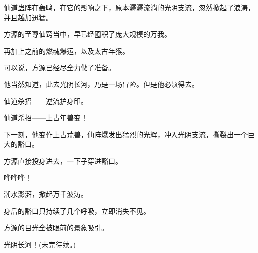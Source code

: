 \begin{this_body}
仙道蛊阵在轰鸣，在它的影响之下，原本潺潺流淌的光阴支流，忽然掀起了浪涛，并且越加迅猛。

方源的至尊仙窍当中，早已经囤积了庞大规模的万我。

再加上之前的燃魂爆运，以及太古年猴。

可以说，方源已经尽全力做了准备。

他当然知道，此去光阴长河，乃是一场冒险。但是他必须得去。

仙道杀招——逆流护身印。

仙道杀招——上古年兽变！

下一刻，他变作上古荒兽，仙阵爆发出猛烈的光辉，冲入光阴支流，撕裂出一个巨大的豁口。

方源直接投身进去，一下子穿进豁口。

哗哗哗！

潮水澎湃，掀起万千波涛。

身后的豁口只持续了几个呼吸，立即消失不见。

方源的目光全被眼前的景象吸引。

光阴长河！(未完待续。)

\end{this_body}


